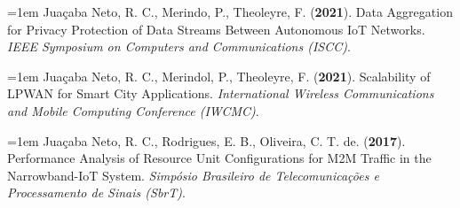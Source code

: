 
{\small

\hangindent=1em
Juaçaba Neto, R. C., Merindo, P., Theoleyre, F. (\textbf{2021}). Data Aggregation for Privacy Protection of Data Streams Between Autonomous IoT Networks. \textit{IEEE Symposium on Computers and Communications (ISCC)}.
\enskip

\hangindent=1em
Juaçaba Neto, R. C., Merindol, P., Theoleyre, F. (\textbf{2021}). Scalability of LPWAN for Smart City Applications. \textit{International Wireless Communications and Mobile Computing Conference (IWCMC)}.
\enskip


\hangindent=1em
Juaçaba Neto, R. C., Rodrigues, E. B., Oliveira, C. T. de. (\textbf{2017}). Performance Analysis of Resource Unit Configurations for M2M Traffic in the Narrowband-IoT System. \textit{Simpósio Brasileiro de Telecomunicações e Processamento de Sinais (SbrT)}.

}
